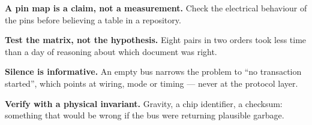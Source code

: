 \begin{keytakeaways}
    \item \textbf{A pin map is a claim, not a measurement.} Check the electrical behaviour of
          the pins before believing a table in a repository.
    \item \textbf{Test the matrix, not the hypothesis.} Eight pairs in two orders took less
          time than a day of reasoning about which document was right.
    \item \textbf{Silence is informative.} An empty bus narrows the problem to ``no
          transaction started'', which points at wiring, mode or timing — never at the
          protocol layer.
    \item \textbf{Verify with a physical invariant.} Gravity, a chip identifier, a checksum:
          something that would be wrong if the bus were returning plausible garbage.
\end{keytakeaways}
